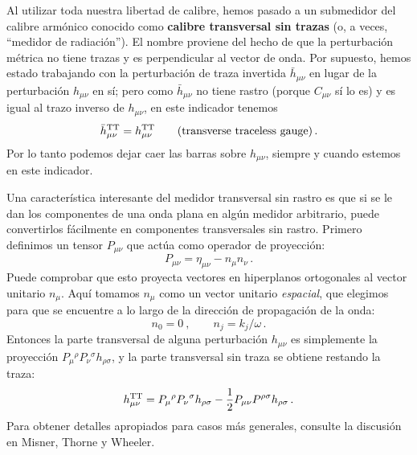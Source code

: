 \documentclass[11pt,b5paper,openany,twoside]{book}
\newcommand{\mn}{{\mu\nu}}
\def\bh{{\bar h}}
\begin{document}
Al utilizar toda nuestra libertad de calibre, hemos pasado a un submedidor del calibre armónico conocido como {\bf calibre transversal sin trazas} (o, a veces, ``medidor de radiación'').
El nombre proviene del hecho de que la perturbación métrica no tiene trazas y es perpendicular al vector de onda.
Por supuesto, hemos estado trabajando con la perturbación de traza invertida $\bh_\mn$ en lugar de la perturbación $h_\mn$ en sí; pero como $\bh_\mn$ no tiene rastro (porque $C_\mn$ sí lo es) y es igual al trazo inverso de $h_\mn$, en este indicador tenemos
\begin{equation}
\bh_\mn^{\rm TT} = h_\mn^{\rm TT}\qquad
{\rm (transverse~traceless~gauge)}\,.\label{6.54}
\end{equation}
Por lo tanto podemos dejar caer las barras sobre $h_\mn$, siempre y cuando estemos en este indicador.

Una característica interesante del medidor transversal sin rastro es que si se le dan los componentes de una onda plana en algún medidor arbitrario, puede convertirlos fácilmente en componentes transversales sin rastro.
Primero definimos un tensor $P_\mn$ que actúa como operador de proyección:
\begin{equation}
P_\mn = \eta_\mn - n_\mu n_\nu\,.\label{6.55}
\end{equation}
Puede comprobar que esto proyecta vectores en hiperplanos ortogonales al vector unitario $n_\mu$.
Aquí tomamos $n_\mu$ como un vector unitario {\it espacial}, que elegimos para que se encuentre a lo largo de la dirección de propagación de la onda:
\begin{equation}
n_0=0\ ,\qquad n_j = k_j/\omega\,.\label{6.56}
\end{equation}
Entonces la parte transversal de alguna perturbación $h_\mn$ es simplemente la proyección $P_\mu{}^\rho P_\nu{}^\sigma h_{\rho\sigma}$, y la parte transversal sin traza se obtiene restando la traza:
\begin{equation}
h^{\rm TT}_\mn = P_\mu{}^\rho P_\nu{}^\sigma h_{\rho\sigma}
-{1\over 2}P_\mn P^{\rho\sigma} h_{\rho\sigma}\,.\label{6.57}
\end{equation}
Para obtener detalles apropiados para casos más generales, consulte la discusión en Misner, Thorne y Wheeler.
\end{document}
